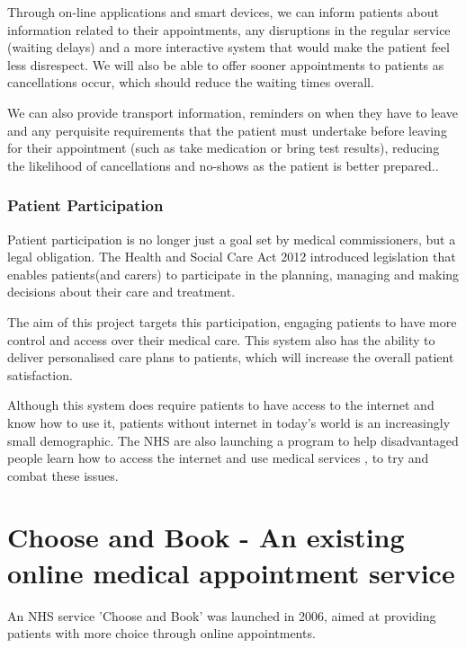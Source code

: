 Through on-line applications and smart devices, we can inform patients about information related to their appointments, any disruptions in the regular service (waiting delays) and a more interactive system that would make the patient feel less disrespect. We will also be able to offer sooner appointments to patients as cancellations occur, which should reduce the waiting times overall.

We can also provide transport information, reminders on when they have to leave and any perquisite requirements that the patient must undertake before leaving for their appointment (such as take medication or bring test results), reducing the likelihood of cancellations and no-shows as the patient is better prepared..

\subsubsection{Patient Participation}

Patient participation is no longer just a goal set by medical commissioners, but a legal obligation. The Health and Social Care Act 2012\cite{HSCA2012} introduced legislation that enables patients(and carers) to participate in the planning, managing and making decisions
about their care and treatment.

The aim of this project targets this participation, engaging patients to have more control and access over their medical care. This system also has the ability to deliver personalised care plans to patients, which will increase the overall patient satisfaction.

Although this system does require patients to have access to the internet and know how to use it, patients without internet in today's world is an increasingly small demographic. The NHS are also launching a program to help disadvantaged people learn how to access the internet and use medical services \cite{timKelsey}, to try and combat these issues. 


\section{Choose and Book - An existing online medical appointment service}

An NHS service 'Choose and Book' was launched in 2006, aimed at providing patients with more choice through online appointments\cite{Walford}.

